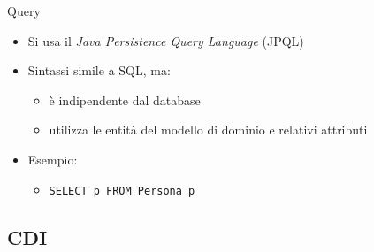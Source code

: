 \begin{frame}{Query}

\begin{itemize}
\item Si usa il \textsl{Java Persistence Query Language} (JPQL)

\vspace{1em}

\item Sintassi simile a SQL, ma:

	\begin{itemize}
	
	\vspace{0.5em}
	
	\item è indipendente dal database
	
	\vspace{0.8em}
	
	\item utilizza le entità del modello di dominio e relativi attributi
	\end{itemize}

\vspace{1em}

\item Esempio:
	\begin{itemize}
	
	\vspace{0.5em}
	
	\item \texttt{SELECT p FROM Persona p}
	\end{itemize}

\end{itemize}

\end{frame}


\subsection{CDI}

